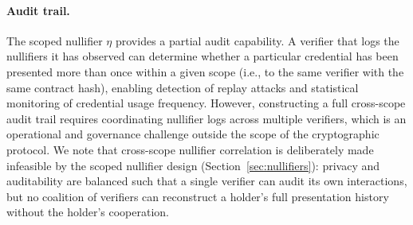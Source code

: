 \paragraph{Audit trail.}
The scoped nullifier $\eta$ provides a partial audit capability.
A verifier that logs the nullifiers it has observed can determine
whether a particular credential has been presented more than once
within a given scope (i.e., to the same verifier with the same
contract hash), enabling detection of replay attacks and statistical
monitoring of credential usage frequency.
However, constructing a full cross-scope audit trail requires
coordinating nullifier logs across multiple verifiers, which is an
operational and governance challenge outside the scope of the
cryptographic protocol.
We note that cross-scope nullifier correlation is deliberately made
infeasible by the scoped nullifier design
(Section~\ref{sec:nullifiers}): privacy and auditability are balanced
such that a single verifier can audit its own interactions, but no
coalition of verifiers can reconstruct a holder's full presentation
history without the holder's cooperation.
